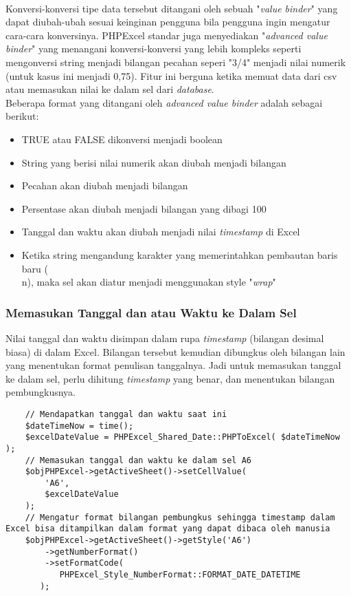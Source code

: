 \paragraph{} Konversi-konversi tipe data tersebut ditangani oleh sebuah "\textit{value binder}" yang dapat diubah-ubah sesuai keinginan pengguna bila pengguna ingin mengatur cara-cara konversinya. PHPExcel standar juga menyediakan "\textit{advanced value binder}" yang menangani konversi-konversi yang lebih kompleks seperti mengonversi string menjadi bilangan pecahan seperi "3/4" menjadi nilai numerik (untuk kasus ini menjadi 0,75). Fitur ini berguna ketika memuat data dari csv atau memasukan nilai ke dalam sel dari \textit{database}.\cite{phpexcel:14}  \\
Beberapa format yang ditangani oleh \textit{advanced value binder} adalah sebagai berikut:
\begin{itemize}
	\item TRUE atau FALSE dikonversi menjadi boolean
	\item String yang berisi nilai numerik akan diubah menjadi bilangan
	\item Pecahan akan diubah menjadi bilangan
	\item Persentase akan diubah menjadi bilangan yang dibagi 100
	\item Tanggal dan waktu akan diubah menjadi nilai \textit{timestamp} di Excel
	\item Ketika string mengandung karakter yang memerintahkan pembautan baris baru (\\n), maka sel akan diatur menjadi menggunakan style "\textit{wrap}" 
\end{itemize}

\subsubsection{Memasukan Tanggal dan atau Waktu ke Dalam Sel}
Nilai tanggal dan waktu disimpan dalam rupa \textit{timestamp} (bilangan desimal biasa) di dalam Excel. Bilangan tersebut kemudian dibungkus oleh bilangan lain yang menentukan format penulisan tanggalnya. Jadi untuk memasukan tanggal ke dalam sel, perlu dihitung \textit{timestamp} yang benar, dan menentukan bilangan pembungkusnya.\cite{phpexcel:14} 
\begin{lstlisting}
	// Mendapatkan tanggal dan waktu saat ini
	$dateTimeNow = time();
	$excelDateValue = PHPExcel_Shared_Date::PHPToExcel( $dateTimeNow );
	// Memasukan tanggal dan waktu ke dalam sel A6
	$objPHPExcel->getActiveSheet()->setCellValue(
	    'A6', 
	    $excelDateValue
	);
	// Mengatur format bilangan pembungkus sehingga timestamp dalam Excel bisa ditampilkan dalam format yang dapat dibaca oleh manusia
	$objPHPExcel->getActiveSheet()->getStyle('A6')
	    ->getNumberFormat()
	    ->setFormatCode(
 	       PHPExcel_Style_NumberFormat::FORMAT_DATE_DATETIME
 	   );
\end{lstlisting}

